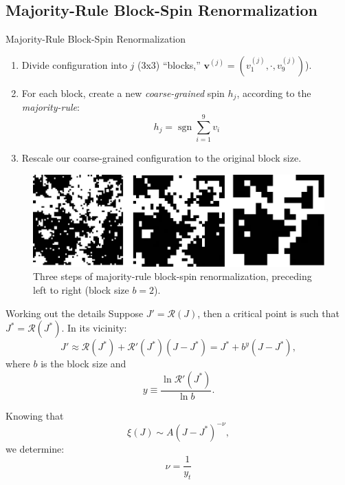 \documentclass{beamer}
\newcommand{\bolds}[1]{\boldsymbol{#1}}
\newcommand{\bv}{\bolds{v}}
\DeclareMathOperator{\sgn}{sgn}
\begin{document}
\subsection{Majority-Rule Block-Spin Renormalization}
\begin{frame}{Majority-Rule Block-Spin Renormalization}
  \begin{enumerate}
  \item Divide configuration into $j$ (3x3) ``blocks,''
    $\bv^{(j)}=(v_1^{(j)},\cdot, v_9^{(j)})$).
  \item For each block, create a new \textit{coarse-grained} spin
    $h_j$, according to the \textit{majority-rule}:
    \begin{equation}%
      \boxed{h_j=\sgn \sum_{i=1}^9 v_i}
    \end{equation}%
  \item Rescale our coarse-grained configuration to the original block
    size.
  \end{enumerate}

\begin{figure}[ht]
  \centering
  \includegraphics[width=.5\textwidth]{figures/block-rg.png}
  \caption{Three steps of majority-rule block-spin renormalization,
    preceding left to right (block size $b=2$).\label{fig:block-rg} }
\end{figure}

\end{frame}


\begin{frame}{Working out the details}
  Suppose $J' = \mathcal{R}(J)$, then a critical point is such that
  $J^* =\mathcal{R}(J^*)$.  In its vicinity:
  \begin{equation}
    J'\approx \mathcal{R}(J^*)+ \mathcal{R}'(J^*)(J-J^*) = J^* + b^y(J-J^*),
  \end{equation}
  where $b$ is the block size and
  \begin{equation}
    y \equiv \frac{\ln{\mathcal{R}'(J^*)}}{\ln{b}}.
  \end{equation}

  Knowing that
  \begin{equation}
    \xi(J) \sim A (J-J^*)^{-\nu},
  \end{equation}
  we determine:
  \begin{equation}%
    \boxed{\nu=\frac{1}{y_t}}
  \end{equation}%
\end{frame}
\end{document}
